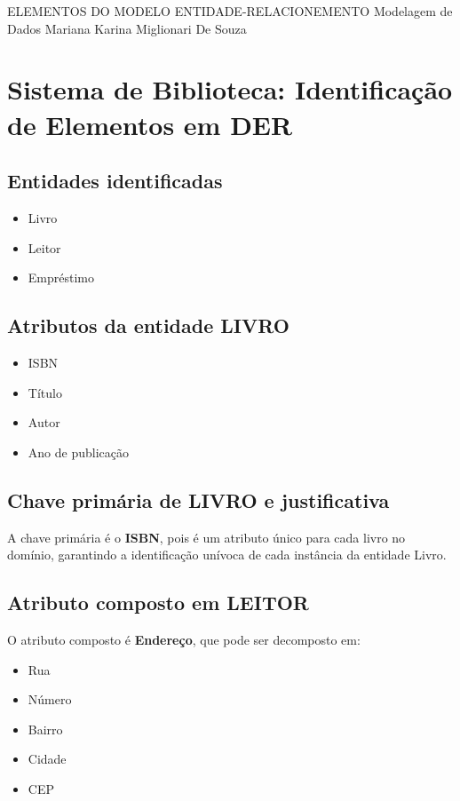 \documentclass[12pt,a4paper]{article}
\begin{document}
\montarinicio
    {ELEMENTOS DO MODELO ENTIDADE-RELACIONEMENTO}
    {Modelagem de Dados}
    {Mariana Karina Miglionari De Souza}

\section{Sistema de Biblioteca: Identificação de Elementos em DER}

\subsection{Entidades identificadas}
\begin{itemize}
\item Livro
\item Leitor
\item Empréstimo
\end{itemize}

\subsection{Atributos da entidade LIVRO}
\begin{itemize}
\item ISBN
\item Título
\item Autor
\item Ano de publicação
\end{itemize}

\subsection{Chave primária de LIVRO e justificativa}

A chave primária é o \textbf{ISBN}, pois é um atributo único para cada livro no domínio, garantindo a identificação unívoca de cada instância da entidade Livro.

\subsection{Atributo composto em LEITOR}

O atributo composto é \textbf{Endereço}, que pode ser decomposto em:
\begin{itemize}
\item Rua
\item Número
\item Bairro
\item Cidade
\item CEP
\end{itemize}
\end{document}
